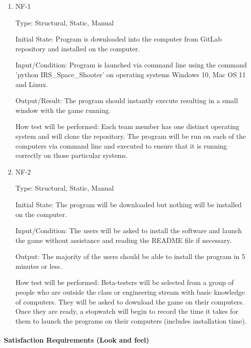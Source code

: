 \documentclass[12pt, titlepage]{article}
\begin{document}
\begin{enumerate}

\item{NF-1\\}

Type: Structural, Static, Manual
                    
Initial State: Program is downloaded into the computer from GitLab repository and installed on the computer. 
                    
Input/Condition: Program is launched via command line using the command 'python IRS\_Space\_Shooter'  on operating systems Windows 10, Mac OS 11 and Linux. 
                    
Output/Result: The program should instantly execute resulting in a small window with the game running.
                    
How test will be performed: Each team member has one distinct operating system and will clone the repository. The program will be run on each of the computers via command line and executed to ensure that it is running correctly on those particular systems. 
                    
\item{NF-2\\}

Type: Structural, Static, Manual
                    
Initial State: The program will be downloaded but nothing will be installed on the computer. 
                    
Input/Condition: The users will be asked to install the software and launch the game without assistance and reading the README file if necessary. 
                    
Output: The majority of the users should be able to install the program in 5 minutes or less.
                    
How test will be performed: Beta-testers will be selected from a group of people who are outside the class or engineering stream with basic knowledge of computers. They will be asked to download the game on their computers. Once they are ready, a stopwatch will begin to record the time it takes for them to launch the programs on their computers (includes installation time). 

\end{enumerate}

\paragraph{Satisfaction Requirements (Look and feel)}
\end{document}
